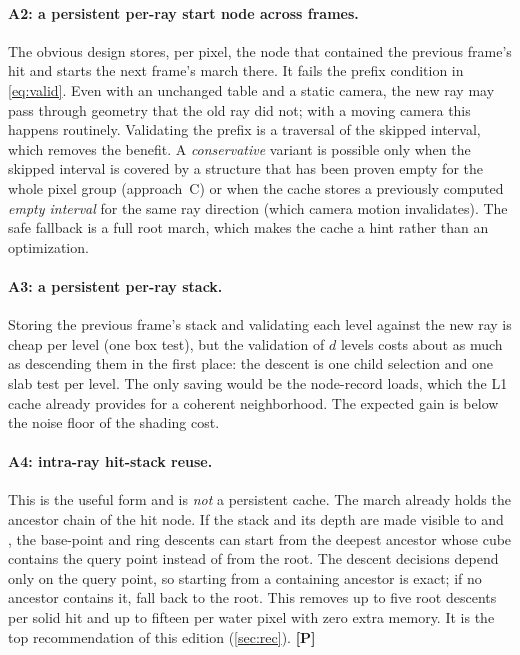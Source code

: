 \documentclass[11pt,a4paper]{article}
\newcommand{\evP}{\textsf{\textbf{\color{evP}[P]}}}
\newcommand{\code}[1]{\texttt{\detokenize{#1}}}
\theoremstyle{plain}
\theoremstyle{definition}
\theoremstyle{remark}
\begin{document}
\paragraph{A2: a persistent per-ray start node across frames.} The obvious
design stores, per pixel, the node that contained the previous frame's hit and
starts the next frame's march there. It fails the prefix condition in
\cref{eq:valid}. Even with an unchanged table and a static camera, the new ray
may pass through geometry that the old ray did not; with a moving camera this
happens routinely. Validating the prefix is a traversal of the skipped
interval, which removes the benefit. A \emph{conservative} variant is possible
only when the skipped interval is covered by a structure that has been proven
empty for the whole pixel group (approach~C) or when the cache stores a
previously computed \emph{empty interval} for the same ray direction (which
camera motion invalidates). The safe fallback is a full root march, which
makes the cache a hint rather than an optimization.

\paragraph{A3: a persistent per-ray stack.} Storing the previous frame's stack
and validating each level against the new ray is cheap per level (one box
test), but the validation of $d$ levels costs about as much as descending them
in the first place: the descent is one child selection and one slab test per
level. The only saving would be the node-record loads, which the L1 cache
already provides for a coherent neighborhood. The expected gain is below the
noise floor of the shading cost.

\paragraph{A4: intra-ray hit-stack reuse.} This is the useful form and is
\emph{not} a persistent cache. The march already holds the ancestor chain of
the hit node. If the stack and its depth are made visible to
\code{rmResolveHitShading} and \code{rmBlendAtHit}, the base-point and ring
descents can start from the deepest ancestor whose cube contains the query
point instead of from the root. The descent decisions depend only on the query
point, so starting from a containing ancestor is exact; if no ancestor
contains it, fall back to the root. This removes up to five root descents per
solid hit and up to fifteen per water pixel with zero extra memory. It is the
top recommendation of this edition (\cref{sec:rec}). \evP
\end{document}
